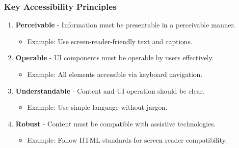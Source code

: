 \documentclass[aspectratio=169]{beamer}
\begin{document}
\begin{frame}[fragile]
    \frametitle{Key Accessibility Principles}
    \begin{enumerate}
        \item \textbf{Perceivable} - Information must be presentable in a perceivable manner.
            \begin{itemize}
                \item Example: Use screen-reader-friendly text and captions.
            \end{itemize}
        \item \textbf{Operable} - UI components must be operable by users effectively.
            \begin{itemize}
                \item Example: All elements accessible via keyboard navigation.
            \end{itemize}
        \item \textbf{Understandable} - Content and UI operation should be clear.
            \begin{itemize}
                \item Example: Use simple language without jargon.
            \end{itemize}
        \item \textbf{Robust} - Content must be compatible with assistive technologies.
            \begin{itemize}
                \item Example: Follow HTML standards for screen reader compatibility.
            \end{itemize}
    \end{enumerate}
\end{frame}
\end{document}
